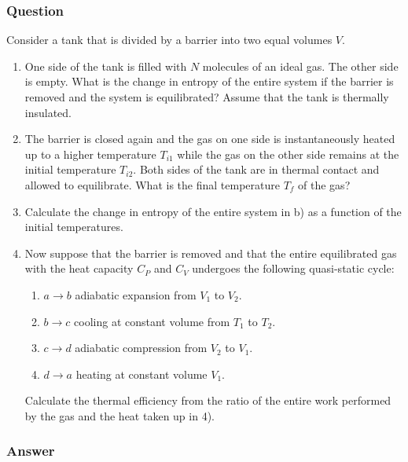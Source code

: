 \subsubsection{Question}
Consider a tank that is divided by a barrier into two equal volumes $V$.
\begin{enumerate}
	\item One side of the tank is filled with $N$ molecules of an ideal gas. The other side is empty. What is the change in entropy of the entire system if the barrier is removed and the system is equilibrated? Assume that the tank is thermally insulated.
	\item The barrier is closed again and the gas on one side is instantaneously heated up to a higher temperature $T_{i1}$ while the gas on the other side remains at the initial temperature $T_{i2}$. Both sides of the tank are in thermal contact and allowed to equilibrate. What is the final temperature $T_f$ of the gas?
	\item Calculate the change in entropy of the entire system in b) as a function of the initial temperatures.
	\item Now suppose that the barrier is removed and that the entire equilibrated gas with the heat capacity $C_P$ and $C_V$ undergoes the following quasi-static cycle:
	\begin{enumerate}
		\item $a \to b$ adiabatic expansion from $V_1$ to $V_2$.
		\item $b \to c$ cooling at constant volume from $T_1$ to $T_2$.
		\item $c \to d$ adiabatic compression from $V_2$ to $V_1$.
		\item $d \to a$ heating at constant volume $V_1$.
	\end{enumerate}
	Calculate the thermal efficiency from the ratio of the entire work performed by the gas and the heat taken up in 4).
\end{enumerate}
\subsubsection{Answer}



